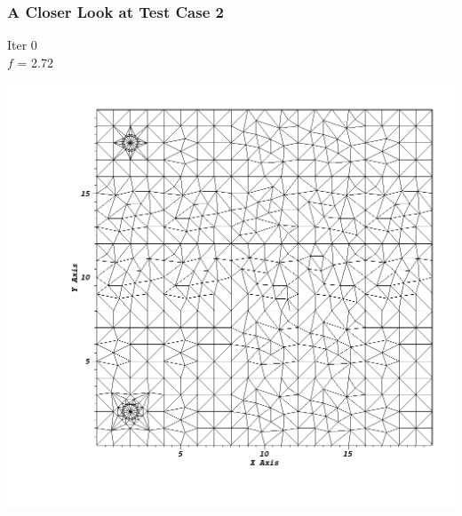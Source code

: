 \documentclass[]{beamer}
\begin{document}
\begin{frame}[t]\frametitle{A Closer Look at Test Case 2}
\begin{minipage}{0.15\textwidth}
\begin{footnotesize}
Iter 0 \\
$f$ = 2.72
\end{footnotesize}
\end{minipage}
\begin{minipage}{0.8\textwidth}
\centering
\includegraphics[scale=0.22]{figures/sameside_before.png}
\end{minipage}
\end{frame}
\end{document}
